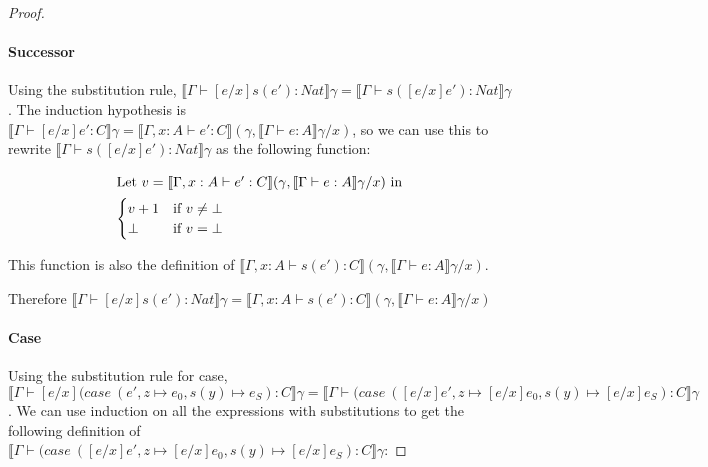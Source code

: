 \begin{proof}
\paragraph{Successor} Using the substitution rule, $\llbracket \Gamma \vdash [e/x]s(e') : Nat \rrbracket \gamma = \llbracket \Gamma \vdash s([e/x]e') : Nat \rrbracket \gamma$. The induction hypothesis is $\llbracket \Gamma \vdash [e/x]e' : C \rrbracket \gamma =\llbracket \Gamma, x : A \vdash e': C \rrbracket (\gamma, \llbracket \Gamma \vdash e : A \rrbracket \gamma / x)$, so we can use this to rewrite $\llbracket \Gamma \vdash s([e/x]e') : Nat \rrbracket \gamma$ as the following  function:

\begin{minipage}{4in}
\begin{align*}
\intertext{Let $v  =\llbracket \Gamma, x : A \vdash e': C \rrbracket (\gamma, \llbracket \Gamma \vdash e : A \rrbracket \gamma / x)$  in}
  \begin{cases}
            v+1 & \text{if } v \neq \bot  \\
           \bot & \text{if } v = \bot
  \end{cases}
\end{align*} 
\end{minipage}

This function is also the definition of $\llbracket \Gamma , x : A \vdash s(e'): C \rrbracket (\gamma, \llbracket \Gamma \vdash e : A \rrbracket \gamma / x)$.

Therefore $\llbracket \Gamma \vdash [e/x]s(e') : Nat \rrbracket \gamma = \llbracket \Gamma , x : A \vdash s(e'): C \rrbracket (\gamma, \llbracket \Gamma \vdash e : A \rrbracket \gamma / x)$

\paragraph{Case} Using the substitution rule for case, $\llbracket \Gamma \vdash [e/x](case \ (e', z \mapsto e_0, s(y) \mapsto e_S) : C \rrbracket \gamma = \llbracket \Gamma \vdash (case \ ([e/x]e', z \mapsto [e/x]e_0, s(y) \mapsto [e/x]e_S) : C \rrbracket \gamma$. We can use induction on all the expressions with substitutions to get the following definition of $\llbracket \Gamma \vdash (case \ ([e/x]e' ,z \mapsto [e/x]e_0, s(y) \mapsto [e/x]e_S) : C \rrbracket \gamma$:


\end{proof}
